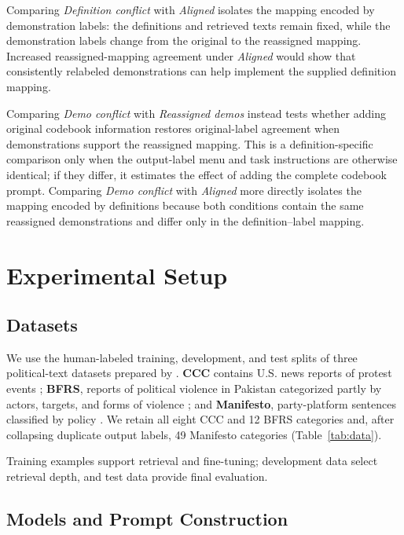\documentclass[11pt]{article}
\begin{document}
Comparing \emph{Definition conflict} with \emph{Aligned} isolates the mapping encoded by demonstration labels: the definitions and retrieved texts remain fixed, while the demonstration labels change from the original to the reassigned mapping. Increased reassigned-mapping agreement under \emph{Aligned} would show that consistently relabeled demonstrations can help implement the supplied definition mapping.

Comparing \emph{Demo conflict} with \emph{Reassigned demos} instead tests whether adding original codebook information restores original-label agreement when demonstrations support the reassigned mapping. This is a definition-specific comparison only when the output-label menu and task instructions are otherwise identical; if they differ, it estimates the effect of adding the complete codebook prompt. Comparing \emph{Demo conflict} with \emph{Aligned} more directly isolates the mapping encoded by definitions because both conditions contain the same reassigned demonstrations and differ only in the definition--label mapping.

\section{Experimental Setup}
\label{sec:setup}

\subsection{Datasets}
\label{sec:data}

We use the human-labeled training, development, and test splits of three political-text datasets prepared by \citet{halterman2026codebook}. \textbf{CCC} contains U.S. news reports of protest events \citep{crowdcounting2024}; \textbf{BFRS}, reports of political violence in Pakistan categorized partly by actors, targets, and forms of violence \citep{bueno2015bfrs}; and \textbf{Manifesto}, party-platform sentences classified by policy \citep{lehmann2017manifesto}. We retain all eight CCC and 12 BFRS categories and, after collapsing duplicate output labels, 49 Manifesto categories (Table~\ref{tab:data}).

Training examples support retrieval and fine-tuning; development data select retrieval depth, and test data provide final evaluation.

\subsection{Models and Prompt Construction}
\label{sec:m-models}
\end{document}
